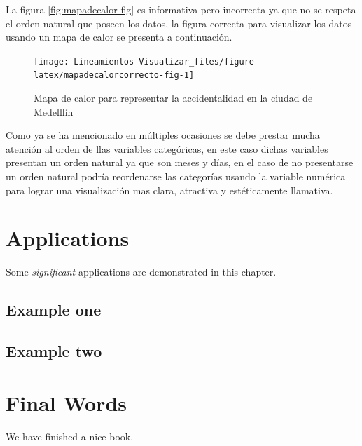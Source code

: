 \documentclass[
]{book}
\begin{document}
La figura \ref{fig:mapadecalor-fig} es informativa pero incorrecta ya que no se respeta el orden natural que poseen los datos, la figura correcta para visualizar los datos usando un mapa de calor se presenta a continuación.

\begin{figure}

{\centering \texttt{[image: Lineamientos-Visualizar\_files/figure-latex/mapadecalorcorrecto-fig-1]} 

}

\caption{Mapa de calor para representar la accidentalidad en la ciudad de Medelllín}\label{fig:mapadecalorcorrecto-fig}
\end{figure}

Como ya se ha mencionado en múltiples ocasiones se debe prestar mucha atención al orden de llas variables categóricas, en este caso dichas variables presentan un orden natural ya que son meses y días, en el caso de no presentarse un orden natural podría reordenarse las categorías usando la variable numérica para lograr una visualización mas clara, atractiva y estéticamente llamativa.

\hypertarget{applications}{%
\chapter{Applications}\label{applications}}

Some \emph{significant} applications are demonstrated in this chapter.

\hypertarget{example-one}{%
\section{Example one}\label{example-one}}

\hypertarget{example-two}{%
\section{Example two}\label{example-two}}

\hypertarget{final-words}{%
\chapter{Final Words}\label{final-words}}

We have finished a nice book.

  
\end{document}

